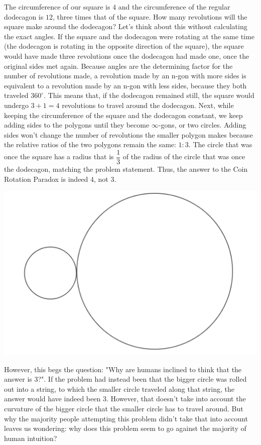 \documentclass{article}
\begin{document}
The circumference of our square is $4$ and the circumference of the regular dodecagon is $12$, three times that of the square. How many revolutions will the square make around the dodecagon? Let's think about this without calculating the exact angles. If the square and the dodecagon were rotating at the same time (the dodecagon is rotating in the opposite direction of the square), the square would have made three revolutions once the dodecagon had made one, once the original sides met again. Because angles are the determining factor for the number of revolutions made, a revolution made by an n-gon with more sides is equivalent to a revolution made by an n-gon with less sides, because they both traveled $360^{\circ}$. This means that, if the dodecagon remained still, the square would undergo $3+1=4$ revolutions to travel around the dodecagon. Next, while keeping the circumference of the square and the dodecagon constant, we keep adding sides to the polygons until they become $\infty$-gons, or two circles. Adding sides won't change the number of revolutions the smaller polygon makes because the relative ratios of the two polygons remain the same: $1:3$. The circle that was once the square has a radius that is $\dfrac{1}{3}$ of the radius of the circle that was once the dodecagon,  matching the problem statement. Thus, the answer to the Coin Rotation Paradox is indeed $4$, not $3$.

\begin{center}
\includegraphics[scale=0.5]{images/weincreasethesidestoinfinity.png}
\end{center}

However, this begs the question: "Why are humans inclined to think that the answer is $3$?". If the problem had instead been that the bigger circle was rolled out into a string, to which the smaller circle traveled along that string, the answer would have indeed been $3$. However, that doesn't take into account the curvature of the bigger circle that the smaller circle has to travel around. But why the majority people attempting this problem didn't take that into account leaves us wondering: why does this problem seem to go against the majority of human intuition? 
\end{document}
